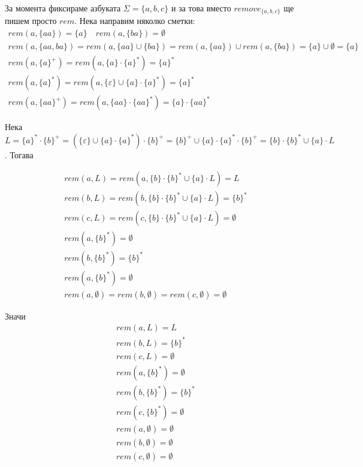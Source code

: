 \documentclass[12pt]{article}
\begin{document}
\vspace{3mm}

За момента фиксираме азбуката \(\Sigma = \{a, b, c\}\) и за това вместо \(remove_{\{a, b, c\}}\) ще пишем просто \(rem\).
Нека направим няколко сметки:
\begin{align*}
    rem(a, \{aa\}) = \{a\} \quad rem(a, \{ba\}) = \emptyset \\
    rem(a, \{aa, ba\}) = rem(a, \{aa\} \cup \{ba\}) = rem(a, \{aa\}) \cup rem(a, \{ba\}) = \{a\} \cup \emptyset = \{a\} \\
    rem(a, \{a\}^+) = rem(a, \{a\} \cdot \{a\}^*) = \{a\}^* \\
    rem(a, \{a\}^*) = rem(a, \{ \varepsilon \} \cup \{a\} \cdot \{a\}^*) = \{a\}^* \\
    rem(a, \{aa\}^+) = rem(a, \{aa\} \cdot \{aa\}^*) = \{a\} \cdot \{aa\}^*
\end{align*}

Нека \(L = \{a\}^* \cdot \{b\}^+ = (\{\varepsilon\} \cup \{a\} \cdot \{a\}^*) \cdot \{b\}^+ = \{b\}^+ \cup  \{a\} \cdot \{a\}^* \cdot \{b\}^+ = \{b\} \cdot \{b\}^* \cup \{a\} \cdot L \). Тогава

\begin{align*}
    rem(a, L ) = rem(a, \{b\} \cdot \{b\}^* \cup \{a\} \cdot L) = L \\
    rem(b, L ) = rem(b, \{b\} \cdot \{b\}^* \cup \{a\} \cdot L) = \{b\}^* \\
    rem(c, L ) = rem(c, \{b\} \cdot \{b\}^* \cup \{a\} \cdot L) = \emptyset \\
    rem(a, \{b\}^*) = \emptyset \\
    rem(b, \{b\}^*) = \{b\}^* \\
    rem(a, \{b\}^*) = \emptyset \\
    rem(a, \emptyset) = rem(b, \emptyset) = rem(c, \emptyset) = \emptyset 
\end{align*}

Значи
\begin{align*}
    rem(a, L) = L \\
    rem(b, L) = \{b\}^* \\
    rem(c, L) = \emptyset \\
    rem(a, \{b\}^*) = \emptyset \\
    rem(b, \{b\}^*) = \{b\}^* \\
    rem(c, \{b\}^*) = \emptyset \\
    rem(a, \emptyset) = \emptyset \\
    rem(b, \emptyset) = \emptyset \\
    rem(c, \emptyset) = \emptyset
\end{align*}
\end{document}

